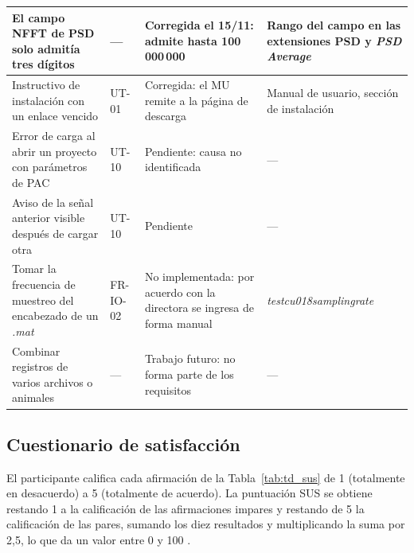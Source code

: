 \documentclass[12pt,letterpaper,oneside]{article}
\DeclareRobustCommand{\_}{\textunderscore\allowbreak}
\begin{document}
\begin{center}
\begin{longtable}{|>{\raggedright\arraybackslash}p{}|>{\raggedright\arraybackslash}p{}|>{\raggedright\arraybackslash}p{}|>{\raggedright\arraybackslash}p{}|}
\hline
El campo NFFT de PSD solo admitía tres dígitos & --- & Corregida el 15/11: admite hasta 100\,000\,000 & Rango del campo en las extensiones PSD y \textit{PSD Average} \\
\hline
Instructivo de instalación con un enlace vencido & UT-01 & Corregida: el MU remite a la página de descarga & Manual de usuario, sección de instalación \\
\hline
Error de carga al abrir un proyecto con parámetros de PAC & UT-10 & Pendiente: causa no identificada & --- \\
\hline
Aviso de la señal anterior visible después de cargar otra & UT-10 & Pendiente & --- \\
\hline
Tomar la frecuencia de muestreo del encabezado de un \textit{.mat} & FR-IO-02 & No implementada: por acuerdo con la directora se ingresa de forma manual & \textit{test\_cu018\_sampling\_rate} \\
\hline
Combinar registros de varios archivos o animales & --- & Trabajo futuro: no forma parte de los requisitos & --- \\
\hline
\end{longtable}
\end{center}

\subsection{Cuestionario de satisfacción}
El participante califica cada afirmación de la Tabla~\ref{tab:td_sus} de 1 (totalmente en desacuerdo) a 5 (totalmente de acuerdo). La puntuación SUS se obtiene restando 1 a la calificación de las afirmaciones impares y restando de 5 la calificación de las pares, sumando los diez resultados y multiplicando la suma por 2,5, lo que da un valor entre 0 y 100 \cite{brooke1996}.
\end{document}
